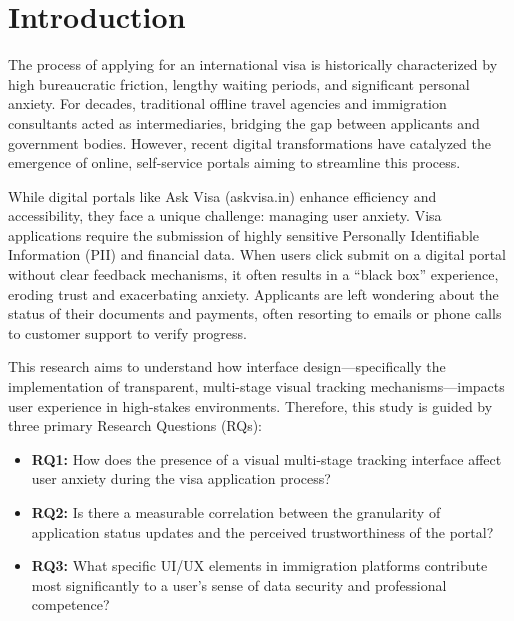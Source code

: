 \documentclass[journal, 10pt, twoside]{IEEEtran}
\begin{document}
\section{Introduction}
\label{sec:introduction}

The process of applying for an international visa is historically characterized by high bureaucratic friction, lengthy waiting periods, and significant personal anxiety. For decades, traditional offline travel agencies and immigration consultants acted as intermediaries, bridging the gap between applicants and government bodies. However, recent digital transformations have catalyzed the emergence of online, self-service portals aiming to streamline this process.

While digital portals like Ask Visa (askvisa.in) enhance efficiency and accessibility, they face a unique challenge: managing user anxiety. Visa applications require the submission of highly sensitive Personally Identifiable Information (PII) and financial data. When users click submit on a digital portal without clear feedback mechanisms, it often results in a ``black box'' experience, eroding trust and exacerbating anxiety. Applicants are left wondering about the status of their documents and payments, often resorting to emails or phone calls to customer support to verify progress.

This research aims to understand how interface design—specifically the implementation of transparent, multi-stage visual tracking mechanisms—impacts user experience in high-stakes environments. Therefore, this study is guided by three primary Research Questions (RQs):
\begin{itemize}
    \item \textbf{RQ1:} How does the presence of a visual multi-stage tracking interface affect user anxiety during the visa application process?
    \item \textbf{RQ2:} Is there a measurable correlation between the granularity of application status updates and the perceived trustworthiness of the portal?
    \item \textbf{RQ3:} What specific UI/UX elements in immigration platforms contribute most significantly to a user's sense of data security and professional competence?
\end{itemize}

\end{document}
